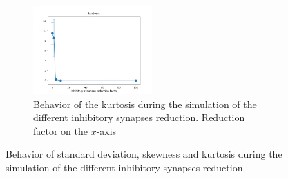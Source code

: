 \begin{figure}
\begin{subfigure}[t]{0.48\textwidth}
  \end{subfigure}
  \begin{subfigure}[t]{\textwidth}
    \centering
    \includegraphics[width=0.5\textwidth]{kurtosis_evolution}
    \caption{Behavior of the kurtosis during the simulation of the different inhibitory synapses reduction. Reduction factor on the $x$-axis}
    \label{fig:kurtosis-evolution}
  \end{subfigure}
  \caption{Behavior of standard deviation, skewness and kurtosis during the simulation of the different inhibitory synapses reduction.}
  \label{fig:feature-distribution-behavior-1}
\end{figure}

